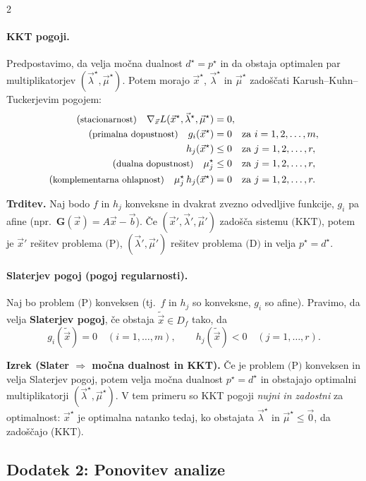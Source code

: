 \documentclass{article}
\begin{document}
\begin{multicols}{2}
	\paragraph{KKT pogoji.}
	Predpostavimo, da velja močna dualnost \(d^\star=p^\star\) in da obstaja optimalen par multiplikatorjev \((\vec{\lambda}^\star,\vec{\mu}^\star)\).
	Potem morajo \(\vec{x}^\star\), \(\vec{\lambda}^\star\) in \(\vec{\mu}^\star\) zadoščati Karush--Kuhn--Tuckerjevim pogojem:
	\[
		\begin{aligned}
			\text{(\small stacionarnost)}\quad
			\nabla_{\vec{x}} L(\vec{x}^\star, \vec{\lambda}^\star, \vec{\mu}^\star) & = 0,                                     \\
			\text{(\small primalna dopustnost)}\quad
			g_i(\vec{x}^\star)                                                      & = 0 \quad \text{za } i = 1,2,\ldots,m,   \\
			h_j(\vec{x}^\star)                                                      & \le 0 \quad \text{za } j = 1,2,\ldots,r, \\
			\text{(\small dualna dopustnost)}\quad
			\mu_j^\star                                                             & \le 0 \quad \text{za } j = 1,2,\ldots,r, \\
			\text{(\small komplementarna ohlapnost)}\quad
			\mu_j^\star\, h_j(\vec{x}^\star)                                        & = 0 \quad \text{za } j = 1,2,\ldots,r.
		\end{aligned}
	\]

	\textbf{Trditev.}
	Naj bodo \(f\) in \(h_j\) konveksne in dvakrat zvezno odvedljive funkcije, \(g_i\) pa afine (npr.\ \(\mathbf{G}(\vec{x})=A\vec{x}-\vec{b}\)).
	Če \((\vec{x}',\vec{\lambda}',\vec{\mu}')\) zadošča sistemu \(\text{(KKT)}\), potem je \(\vec{x}'\) rešitev problema \(\text{(P)}\),
	\((\vec{\lambda}',\vec{\mu}')\) rešitev problema \(\text{(D)}\) in velja \(p^\star = d^\star\).

	\paragraph{Slaterjev pogoj (pogoj regularnosti).}
	Naj bo problem \(\text{(P)}\) konveksen (tj.\ \(f\) in \(h_j\) so konveksne, \(g_i\) so afine).
	Pravimo, da velja \textbf{Slaterjev pogoj}, če obstaja \(\tilde{\vec{x}}\in D_f\) tako, da
	\[
		g_i(\tilde{\vec{x}})=0 \quad (i=1,\ldots,m),
		\qquad
		h_j(\tilde{\vec{x}})<0 \quad (j=1,\ldots,r).
	\]

	\textbf{Izrek (Slater \(\Rightarrow\) močna dualnost in KKT).}
	Če je problem \(\text{(P)}\) konveksen in velja Slaterjev pogoj, potem velja močna dualnost \(p^\star=d^\star\) in obstajajo optimalni multiplikatorji
	\((\vec{\lambda}^\star,\vec{\mu}^\star)\).
	V tem primeru so KKT pogoji \emph{nujni in zadostni} za optimalnost: \(\vec{x}^\star\) je optimalna natanko tedaj, ko obstajata
	\(\vec{\lambda}^\star\) in \(\vec{\mu}^\star\le \vec{0}\), da zadoščajo (KKT).
	\subsection{Dodatek 2: Ponovitev analize}

	

\end{multicols}
\end{document}
